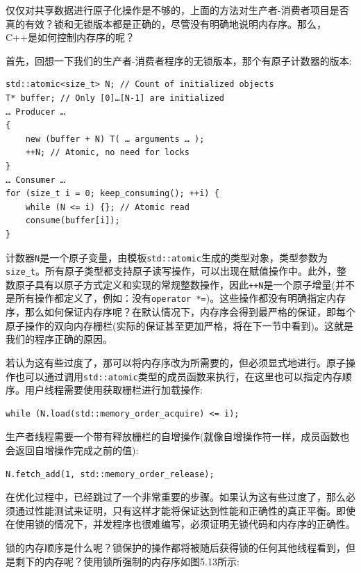 仅仅对共享数据进行原子化操作是不够的，上面的方法对生产者-消费者项目是否真的有效？锁和无锁版本都是正确的，尽管没有明确地说明内存序。那么，C++是如何控制内存序的呢？


首先，回想一下我们的生产者-消费者程序的无锁版本，那个有原子计数器的版本:

\begin{lstlisting}[style=styleCXX]
std::atomic<size_t> N; // Count of initialized objects
T* buffer; // Only [0]…[N-1] are initialized
… Producer …
{
	new (buffer + N) T( … arguments … );
	++N; // Atomic, no need for locks
}
… Consumer …
for (size_t i = 0; keep_consuming(); ++i) {
	while (N <= i) {}; // Atomic read
	consume(buffer[i]);
}
\end{lstlisting}

计数器\texttt{N}是一个原子变量，由模板\texttt{std::atomic}生成的类型对象，类型参数为\texttt{size\_t}。所有原子类型都支持原子读写操作，可以出现在赋值操作中。此外，整数原子具有以原子方式定义和实现的常规整数操作，因此\texttt{++N}是一个原子增量(并不是所有操作都定义了，例如：没有\texttt{operator *=})。这些操作都没有明确指定内存序，那么如何保证内存序呢？在默认情况下，内存序会得到最严格的保证，即每个原子操作的双向内存栅栏(实际的保证甚至更加严格，将在下一节中看到)。这就是我们的程序正确的原因。

若认为这有些过度了，那可以将内存序改为所需要的，但必须显式地进行。原子操作也可以通过调用\texttt{std::atomic}类型的成员函数来执行，在这里也可以指定内存顺序。用户线程需要使用获取栅栏进行加载操作:

\begin{lstlisting}[style=styleCXX]
while (N.load(std::memory_order_acquire) <= i);
\end{lstlisting}

生产者线程需要一个带有释放栅栏的自增操作(就像自增操作符一样，成员函数也会返回自增操作完成之前的值):

\begin{lstlisting}[style=styleCXX]
N.fetch_add(1, std::memory_order_release);
\end{lstlisting}

在优化过程中，已经跳过了一个非常重要的步骤。如果认为这有些过度了，那么必须通过性能测试来证明，只有这样才能将保证达到性能和正确性的真正平衡。即使在使用锁的情况下，并发程序也很难编写，必须证明无锁代码和内存序的正确性。

锁的内存顺序是什么呢？锁保护的操作都将被随后获得锁的任何其他线程看到，但是剩下的内存呢？使用锁所强制的内存序如图5.13所示:

